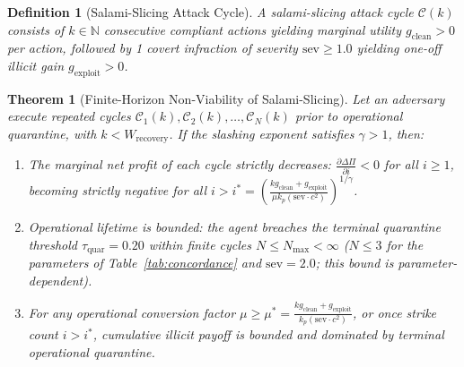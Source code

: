 \documentclass[journal]{IEEEtran}
\newtheorem{theorem}{Theorem}
\newtheorem{definition}{Definition}
\begin{document}
\begin{definition}[Salami-Slicing Attack Cycle]
A salami-slicing attack cycle $\mathcal{C}(k)$ consists of $k \in \mathbb{N}$ consecutive compliant actions yielding marginal utility $g_{\text{clean}} > 0$ per action, followed by 1 covert infraction of severity $\text{sev} \ge 1.0$ yielding one-off illicit gain $g_{\text{exploit}} > 0$.
\end{definition}

\begin{theorem}[Finite-Horizon Non-Viability of Salami-Slicing]
\label{thm:salami}
Let an adversary execute repeated cycles $\mathcal{C}_1(k), \mathcal{C}_2(k), \dots, \mathcal{C}_N(k)$ prior to operational quarantine, with $k < W_{\text{recovery}}$. If the slashing exponent satisfies $\gamma > 1$, then:
\begin{enumerate}[leftmargin=12pt, topsep=2pt, itemsep=1pt]
\item The marginal net profit of each cycle strictly decreases: $\frac{\partial \Delta\Pi}{\partial i} < 0$ for all $i \ge 1$, becoming strictly negative for all $i > i^* = \left( \frac{k g_{\text{clean}} + g_{\text{exploit}}}{\mu k_p (\text{sev} \cdot c^2)} \right)^{1/\gamma}$.
\item Operational lifetime is bounded: the agent breaches the terminal quarantine threshold $\tau_{\text{quar}} = 0.20$ within finite cycles $N \le N_{\text{max}} < \infty$ ($N \le 3$ for the parameters of Table~\ref{tab:concordance} and $\text{sev} = 2.0$; this bound is parameter-dependent).
\item For any operational conversion factor $\mu \ge \mu^* = \frac{k g_{\text{clean}} + g_{\text{exploit}}}{k_p (\text{sev} \cdot c^2)}$, or once strike count $i > i^*$, cumulative illicit payoff is bounded and dominated by terminal operational quarantine.
\end{enumerate}
\end{theorem}
\end{document}

